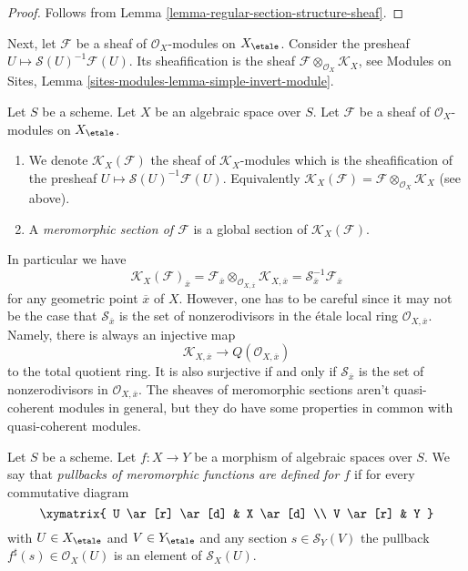 \begin{proof}
Follows from Lemma \ref{lemma-regular-section-structure-sheaf}.
\end{proof}

\noindent
Next, let $\mathcal{F}$ be a sheaf of $\mathcal{O}_X$-modules
on $X_\etale$.
Consider the presheaf $U \mapsto \mathcal{S}(U)^{-1}\mathcal{F}(U)$.
Its sheafification is the sheaf
$\mathcal{F} \otimes_{\mathcal{O}_X} \mathcal{K}_X$, see
Modules on Sites, Lemma \ref{sites-modules-lemma-simple-invert-module}.

\begin{definition}
\label{definition-meromorphic-section}
Let $S$ be a scheme. Let $X$ be an algebraic space over $S$.
Let $\mathcal{F}$ be a sheaf of $\mathcal{O}_X$-modules
on $X_\etale$.
\begin{enumerate}
\item We denote $\mathcal{K}_X(\mathcal{F})$ the sheaf of
$\mathcal{K}_X$-modules which is the sheafification of the presheaf
$U \mapsto \mathcal{S}(U)^{-1}\mathcal{F}(U)$. Equivalently
$\mathcal{K}_X(\mathcal{F}) =
\mathcal{F} \otimes_{\mathcal{O}_X} \mathcal{K}_X$ (see above).
\item A {\it meromorphic section of $\mathcal{F}$}
is a global section of $\mathcal{K}_X(\mathcal{F})$.
\end{enumerate}
\end{definition}

\noindent
In particular we have
$$
\mathcal{K}_X(\mathcal{F})_{\overline{x}}
=
\mathcal{F}_{\overline{x}}
\otimes_{\mathcal{O}_{X, \overline{x}}} \mathcal{K}_{X, \overline{x}}
=
\mathcal{S}_{\overline{x}}^{-1}\mathcal{F}_{\overline{x}}
$$
for any geometric point $\overline{x}$ of $X$.
However, one has to be careful since it may
not be the case that $\mathcal{S}_{\overline{x}}$ is the set of nonzerodivisors
in the \'etale local ring $\mathcal{O}_{X, \overline{x}}$.
Namely, there is always an injective map
$$
\mathcal{K}_{X, \overline{x}} \longrightarrow Q(\mathcal{O}_{X, \overline{x}})
$$
to the total quotient ring. It is also surjective if and only if
$\mathcal{S}_{\overline{x}}$ is the set of nonzerodivisors in
$\mathcal{O}_{X, \overline{x}}$.
The sheaves of meromorphic sections aren't quasi-coherent
modules in general, but they do have some properties in common
with quasi-coherent modules.

\begin{definition}
\label{definition-pullback-meromorphic-sections}
Let $S$ be a scheme. Let $f : X \to Y$ be a morphism
of algebraic spaces over $S$. We say that {\it pullbacks of meromorphic
functions are defined for $f$} if for every commutative diagram
$$
\xymatrix{
U \ar[r] \ar[d] & X \ar[d] \\
V \ar[r] & Y
}
$$
with $U \in X_\etale$ and $V \in Y_\etale$ and any
section $s \in \mathcal{S}_Y(V)$ the pullback
$f^\sharp(s) \in \mathcal{O}_X(U)$ is an element
of $\mathcal{S}_X(U)$.
\end{definition}

